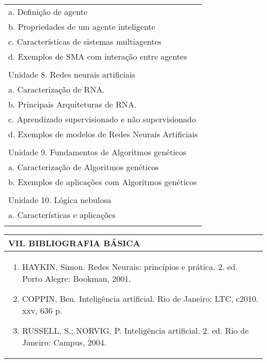 \documentclass[12pt]{article}
\begin{document}
\begin{longtable}{|L{1.025\textwidth}|}
          a. Definição de agente \\
          b. Propriedades de um agente inteligente\\
          c. Características de sistemas multiagentes \\
          d. Exemplos de SMA com interação entre agentes\\
\\
Unidade 8. Redes neurais artificiais \\
       a. Caracterização de RNA. \\
       b. Principais Arquiteturas de RNA.\\
       c. Aprendizado supervisionado e não supervisionado\\
       d. Exemplos de modelos de Redes Neurais Artificiais\\
  \\
Unidade  9. Fundamentos de Algoritmos genéticos\\
a. Caracterização de Algoritmos genéticos\\
b. Exemplos de aplicações com Algoritmos genéticos\\
\\
Unidade 10. Lógica nebulosa\\
          a. Características e aplicações\\
\\ \hline
\end{longtable} 



\begin{longtable}{|L{1.025\textwidth}|} \hline
%
{\bf VII. BIBLIOGRAFIA BÁSICA} \\ \hline
\begin{enumerate}
%
\item HAYKIN, Simon. Redes Neurais: princípios e prática. 2. ed. Porto Alegre: Bookman, 2001.
\item COPPIN, Ben. Inteligência artificial. Rio de Janeiro: LTC, c2010. xxv, 636 p.
\item RUSSELL, S.; NORVIG, P. Inteligência artificial. 2. ed. Rio de Janeiro: Campus, 2004.
%

\end{enumerate}
 \\ \hline
\end{longtable}


\newpage
\end{document}
